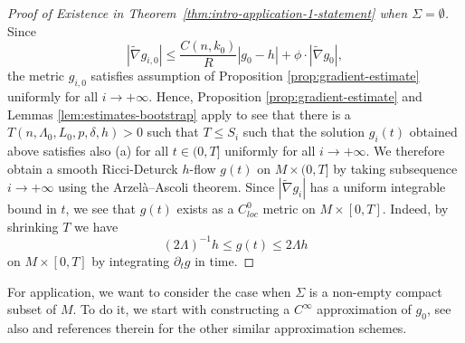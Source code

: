\documentclass[12pt]{amsart}
\theoremstyle{plain}
\theoremstyle{plain}
\theoremstyle{definition}
\theoremstyle{remark}
\numberwithin{equation}{subsection}
\newcommand{\hdel}{\tilde{\nabla}}
\begin{document}
\begin{proof}[Proof of Existence in  Theorem~\ref{thm:intro-application-1-statement} when $\Sigma=\emptyset$]
Since 
\begin{equation}
|\hdel g_{i,0}|\leq \frac{C(n,k_0)}{R}|g_0-h|+\phi\cdot |\hdel g_0|,
\end{equation}
the metric $g_{i,0}$ satisfies assumption of  Proposition \ref{prop:gradient-estimate} uniformly for all $i\to+\infty$. Hence, Proposition \ref{prop:gradient-estimate} and Lemmas \ref{lem:estimates-bootstrap} apply to see that there is a $T(n, \Lambda_0, L_0, p, \delta,h) > 0$ such that  $T \leq S_i$ such that the solution $g_i(t)$ obtained above satisfies also (a) for all $t \in (0, T]$ uniformly for all $i\to+\infty$. We therefore obtain a smooth Ricci-Deturck $h$-flow $g(t)$ on $M\times (0,T]$ by taking subsequence $i\to+\infty$ using  the Arzel\`a--Ascoli theorem. Since $|\hdel g_i|$ has a uniform integrable bound in $t$, we see that $g(t)$ exists as a $C^0_{loc}$ metric on $M\times [0,T]$. Indeed, by shrinking $T$ we have 
\begin{equation}
(2\Lambda)^{-1}h\leq g(t)\leq 2\Lambda h
\end{equation}
on $M\times [0,T]$ by integrating $\partial_t g$ in time.  
\end{proof}


For application, we want to consider the case when $\Sigma$ is a non-empty compact subset of $M$. To do it, we start with constructing a $C^\infty$ approximation of $g_0$, see also \cite{lee_positive_2013,shi_scalar_2016,
lee_continuous_2021,grant_positive_2014} and references therein for the other similar approximation schemes.
\end{document}
